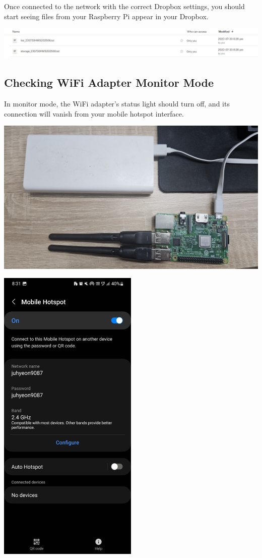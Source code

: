 \documentclass[
  letterpaper,
]{scrbook}
\begin{document}
Once connected to the network with the correct Dropbox settings, you
should start seeing files from your Raspberry Pi appear in your Dropbox.

\includegraphics{content/material/ch2/check_dropbox_upload.png}

\hypertarget{checking-wifi-adapter-monitor-mode}{%
\subsection{Checking WiFi Adapter Monitor
Mode}\label{checking-wifi-adapter-monitor-mode}}

In monitor mode, the WiFi adapter's status light should turn off, and
its connection will vanish from your mobile hotspot interface.

\includegraphics{content/material/ch2/plug_external.jpg}

\includegraphics[width=0.5\textwidth,height=\textheight]{content/material/ch2/check_hotspot_off.jpg}
\end{document}
